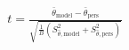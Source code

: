 \begin{align*}
t = \frac{\bar{\theta}_{\text{model}} - \bar{\theta}_{\text{pers}}}{\sqrt{\frac{1}{B}\left(S_{\hat{\theta},\text{model}}^2 + S_{\hat{\theta},\text{pers}}^2\right)}}
\end{align*}
